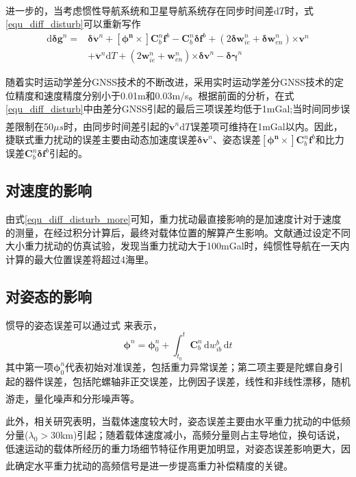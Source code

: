 \documentclass[12pt,a4,utf8]{article}
\newcommand{\upcite}[1]{\textsuperscript{\textsuperscript{\cite{#1}}}} %
\begin{document}
进一步的，当考虑惯性导航系统和卫星导航系统存在同步时间差$\text{d}T$时\upcite{schwarz1995some}，式\ref{equ_diff_disturb}可以重新写作
\begin{equation}
      \begin{aligned}
      \text{d}\bm{\delta g}^n = &\bm{\delta} \dot{\bm{v}}^n + \bm{[\phi^n\times]}\bm{C}^n_b \bm{f}^b - \bm{C}^n_b \bm{\delta f}^b + (2\bm{\delta w}^n_{ie} + \bm{\delta w}^n_{en})\bm{\times v}^n
      \\
      &+\ddot{\bm{v}}^n\text{d}T+(2\bm{w}^n_{ie} + \bm{w}^n_{en})\bm{\times \delta v}^n - \bm{\delta \gamma}^n
      \end{aligned}
      \label{equ_diff_disturb_more}
\end{equation}

随着实时运动学差分GNSS技术的不断改进，采用实时运动学差分GNSS技术的定位精度和速度精度分别小于0.01m和0.03m/s。根据前面的分析，在式\ref{equ_diff_disturb}中由差分GNSS引起的最后三项误差均低于1mGal;当时间同步误差限制在50$\mu s$时，由同步时间差引起的$\ddot{\bm{v}}^n\text{d}T$误差项可维持在1mGal以内\upcite{hao2024methods}。因此，捷联式重力扰动的误差主要由动态加速度误差$\bm{\delta} \dot{\bm{v}}^n$、姿态误差$\bm{[\phi^n\times]}\bm{C}^n_b \bm{f}^b$和比力误差$\bm{C}^n_b \bm{\delta f}^b$引起的。

\subsection{对速度的影响}
由式\ref{equ_diff_disturb_more}可知，重力扰动最直接影响的是加速度计对于速度的测量，在经过积分计算后，最终对载体位置的解算产生影响。文献\cite{gao2021real}通过设定不同大小重力扰动的仿真试验，发现当重力扰动大于100mGal时，纯惯性导航在一天内计算的最大位置误差将超过4海里。

\subsection{对姿态的影响}
惯导的姿态误差可以通过式 来表示，
\begin{equation}
      \bm{\phi}^n = \bm{\phi}^n_0 + \int_{t_0}^{t}{\bm{C}^n_b \,\text{d}w^b_{ib} \,\text{d}t}
\end{equation}
其中第一项$\bm{\phi}^n_0$代表初始对准误差，包括重力异常误差；第二项主要是陀螺自身引起的器件误差，包括陀螺轴非正交误差，比例因子误差，线性和非线性漂移，随机游走，量化噪声和分形噪声等\upcite{savage1978strapdown,li1995chaotic}。


此外，相关研究表明，当载体速度较大时，姿态误差主要由水平重力扰动的中低频分量($\lambda_0>30$km)引起；随着载体速度减小，高频分量则占主导地位，换句话说，低速运动的载体所经历的重力场细节特征作用更加明显，对姿态误差影响更大，因此确定水平重力扰动的高频信号是进一步提高重力补偿精度的关键\upcite{jekeli1994airborne,1020386196.nh}。
\end{document}
